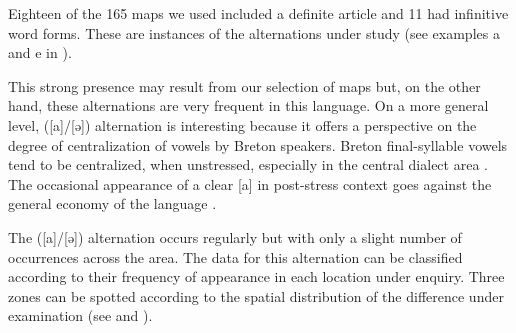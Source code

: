 \documentclass[output=paper]{LSP/langsci}
\begin{document}
\begin{table}
\caption{Phonetic contexts for the alternations ([a]/[ə])}
\label{tab:5}
\end{table}

Eighteen of the 165 maps we used included a definite article and 11 had infinitive word forms. These are instances of the alternations under study (see examples a and e in ).

This strong presence may result from our selection of maps but, on the other hand, these alternations are very frequent in this language. On a more general level, ([a]/[ə]) alternation is interesting because it offers a perspective on the degree of centralization of vowels by Breton speakers. Breton final-syllable vowels tend to be centralized, when unstressed, especially in the central dialect area \citep[8-10]{wmffre_central_1998}. The occasional appearance of a clear [a] in post-stress context goes against the general economy of the language \citep{martinet_economie_1955}.

The ([a]/[ə]) alternation occurs regularly but with only a slight number of occurrences across the area. The data for this alternation can be classified according to their frequency of appearance in each location under enquiry. Three zones can be spotted according to the spatial distribution of the difference under examination (see  and ). 
\end{document}
